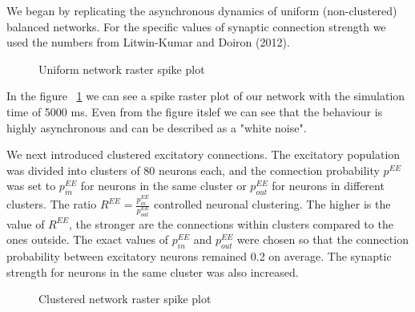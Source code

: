 \documentclass[11pt]{article}
\begin{document}

We began by replicating the asynchronous dynamics of uniform (non-clustered) balanced networks. For the specific values of synaptic connection strength we used the numbers from Litwin-Kumar and Doiron (2012). 

\begin{figure}[h]
\caption{Uniform network raster spike plot}
\label{fig:uniform}
\end{figure}

In the figure ~\ref{fig:uniform} we can see a spike raster plot of our network with the simulation time of 5000 ms. Even from the figure itslef we can see that the behaviour is highly asynchronous and can be described as a "white noise". 


We next introduced clustered excitatory connections. The excitatory population was divided into clusters of 80 neurons each, and the connection probability $p^{EE}$ was set to $p_{in}^{EE}$ for neurons in the same cluster or $p_{out}^{EE}$ for neurons in different clusters. The ratio $R^{EE} = \frac{p_{in}^{EE}}{p_{out}^{EE}}$ controlled neuronal clustering. The higher is the value of $R^{EE}$, the stronger are the connections within clusters compared to the ones outside. The exact values of $p_{in}^{EE}$ and $p_{out}^{EE}$ were chosen so that the connection probability between excitatory neurons remained 0.2 on average. The synaptic strength for neurons in the same cluster was also increased. 

\begin{figure}[h]
\caption{Clustered network raster spike plot}
\label{fig:clustered}
\end{figure}
\end{document}
